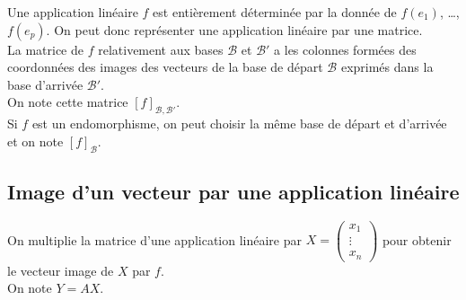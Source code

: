 		Une application linéaire $f$ est entièrement déterminée par la donnée de $f(e_1)$, \ldots, $f(e_p)$.
		On peut donc représenter une application linéaire par une matrice.\\

		La matrice de $f$ relativement aux bases $\mathcal{B}$ et $\mathcal{B}'$ a les colonnes formées des coordonnées des images des vecteurs de la base de départ $\mathcal{B}$ exprimés dans la base d'arrivée $\mathcal{B}'$.\\
		On note cette matrice $[f]_{\mathcal{B},\mathcal{B}'}$.\\

		Si $f$ est un endomorphisme, on peut choisir la même base  de départ et d'arrivée et on note $[f]_{\mathcal{B}}$.

	\subsection{Image d'un vecteur par une application linéaire}

		On multiplie la matrice d'une application linéaire par
		$X = \begin{pmatrix}
			     x_1\\ \vdots\\ x_n
		\end{pmatrix}$
		pour obtenir le vecteur image de $X$ par $f$.\\
		On note $Y = AX$.


